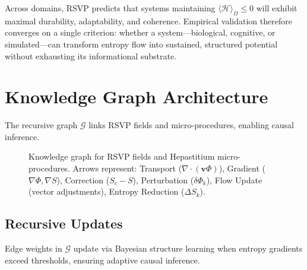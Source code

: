 \documentclass[12pt]{article}
\begin{document}
Across domains, RSVP predicts that systems maintaining
\(\langle \mathcal{H} \rangle_\Omega \le 0\) will exhibit maximal
durability, adaptability, and coherence.
Empirical validation therefore converges on a single criterion:
whether a system—biological, cognitive, or simulated—can transform
entropy flow into sustained, structured potential without exhausting
its informational substrate.

\section{Knowledge Graph Architecture}
\label{sec:knowledge_graph}

The recursive graph \(\mathcal{G}\) links RSVP fields and micro-procedures, enabling causal inference.

\begin{figure}[h]
\centering
{}
\caption{Knowledge graph for RSVP fields and Hepastitium micro-procedures. Arrows represent: Transport (\(\nabla \cdot (\mathbf{v} \Phi)\)), Gradient (\(\nabla \Phi, \nabla S\)), Correction (\(S_c - S\)), Perturbation (\(\delta \Phi_k\)), Flow Update (vector adjustments), Entropy Reduction (\(\Delta S_k\)).}
\label{fig:knowledge_graph}
\end{figure}

\subsection{Recursive Updates}
\label{subsec:recursive_updates}

Edge weights in \(\mathcal{G}\) update via Bayesian structure learning when entropy gradients exceed thresholds, ensuring adaptive causal inference.
\end{document}
